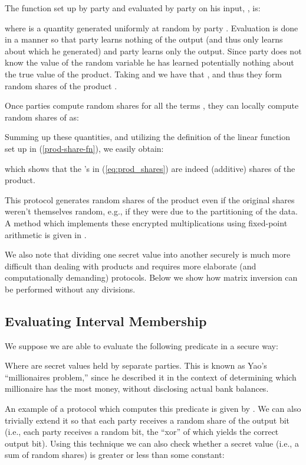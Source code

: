 \documentclass[11pt]{article}
\begin{document}
The function set up by party  and evaluated by party  on his input, , is:


\noindent where  is a quantity generated uniformly at random by party .  Evaluation is done in a manner so that party  learns nothing of the output (and thus only learns about  which he generated) and party  learns only the output.  Since party  does not know the value of the random variable  he has learned potentially nothing about the true value of the product.  Taking  and  we have that , and thus they form random shares of the product .

Once parties compute random shares  for all the terms , they can locally compute random shares of  as:

Summing up these quantities, and utilizing the definition of the linear function set up in (\ref{prod-share-fn}), we easily obtain:

which shows that the 's in (\ref{eq:prod_shares}) are indeed (additive) shares of the product.

This protocol generates random shares of the product even if the original shares weren't themselves random, e.g., if they were due to the partitioning of the data.  A method which implements these encrypted multiplications using fixed-point arithmetic is given in \cite{fhn:10}.  

We also note that dividing one secret value into another securely is much more difficult than dealing with products and requires more elaborate (and computationally demanding) protocols.  Below we show how matrix inversion can be performed without any divisions.

\subsection{Evaluating Interval Membership}\label{sec:yaosgt}
We suppose we are able to evaluate the following predicate in a secure way:

Where  are secret values held by separate parties.  This is known as Yao's ``millionaires problem,'' since he described it in the context of determining which millionaire has the most money, without disclosing actual bank balances.

An example of a protocol which computes this predicate is given by \citet{gt_proto}.  We can also trivially extend it so that each party receives a random share of the output bit (i.e., each party receives a random bit, the ``xor'' of which yields the correct output bit).  Using this technique we can also check whether a secret value (i.e., a sum of random shares) is greater or less than some constant:
\end{document}

